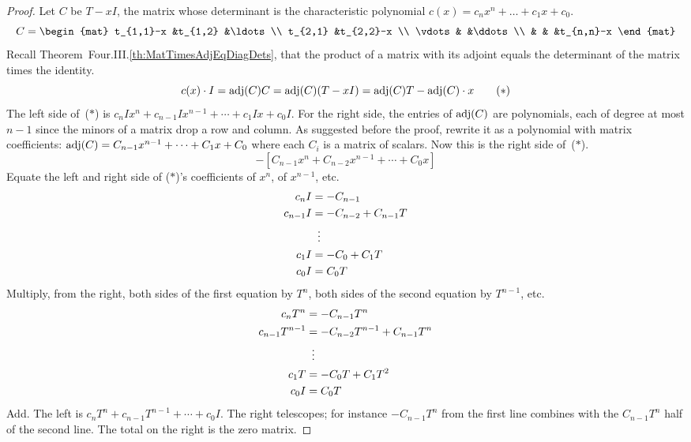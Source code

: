 \begin{proof}
Let \( C \) be \( T-xI \),
the matrix whose determinant is the characteristic polynomial
\( c(x)=c_nx^n+\dots+c_1x+c_0 \).
\begin{equation*}
  C=\begin{mat}
    t_{1,1}-x        &t_{1,2}   &\ldots        \\
    t_{2,1}          &t_{2,2}-x               \\
    \vdots           &          &\ddots       \\
                     &          &       &t_{n,n}-x
  \end{mat}
\end{equation*}
Recall Theorem~Four.III.\ref{th:MatTimesAdjEqDiagDets},
that the product of a matrix with its adjoint equals
the determinant of the matrix times the identity.
\begin{equation*}
  c(x)\cdot I
  =\operatorname{adj} (C)C
  =\operatorname{adj} (C)(T-xI)
  =\operatorname{adj} (C)T- \operatorname{adj}(C)\cdot x
\tag*{($*$)}
\end{equation*}
The left side of~($*$) is 
$c_nIx^n+c_{n-1}Ix^{n-1}+\cdots+c_1Ix+c_0I$.
For the right side,
the entries of \( \operatorname{adj} (C) \) are polynomials, each of degree
at most \( n-1 \) since the minors of a matrix drop a row and column.
As suggested before the proof, rewrite it as a polynomial with
matrix coefficients:
\( \operatorname{adj} (C)=C_{n-1}x^{n-1}+\cdots+C_1x+C_0 \)
where each \( C_i \) is a matrix of scalars.
Now this is the right side of~($*$).
\begin{equation*}
  [(C_{n-1}T)x^{n-1}+\cdots+(C_1T)x+C_0T]  
   -[C_{n-1}x^n+C_{n-2}x^{n-1}+\cdots+C_0x]
\end{equation*}
Equate the left and right side of ($*$)'s
coefficients of \( x^n \), of $x^{n-1}$, etc.
\begin{align*}
  c_nI
  &=-C_{n-1}    \\
  c_{n-1}I
  &=-C_{n-2}+C_{n-1}T    \\
  &\vdotswithin{=}             \\
  c_{1}I
  &=-C_{0}+C_{1}T    \\
  c_{0}I
  &=C_{0}T
\end{align*}
Multiply, from the right, both sides of the first equation by \( T^n \), 
both sides of the second equation by \( T^{n-1} \), etc.
\begin{align*}
  c_nT^n
  &=-C_{n-1}T^n    \\
  c_{n-1}T^{n-1}
  &=-C_{n-2}T^{n-1}+C_{n-1}T^n    \\
  &\vdotswithin{=}             \\
  c_{1}T
  &=-C_{0}T+C_{1}T^2    \\
  c_{0}I
  &=C_{0}T
\end{align*}
Add.
The left is 
\( c_nT^n+c_{n-1}T^{n-1}+\cdots+c_0I \). 
The right telescopes;
for instance $-C_{n-1}T^n$ from the first line combines with the 
$C_{n-1}T^n$ half of the second line. 
The total on the right is the zero matrix.
\end{proof}

